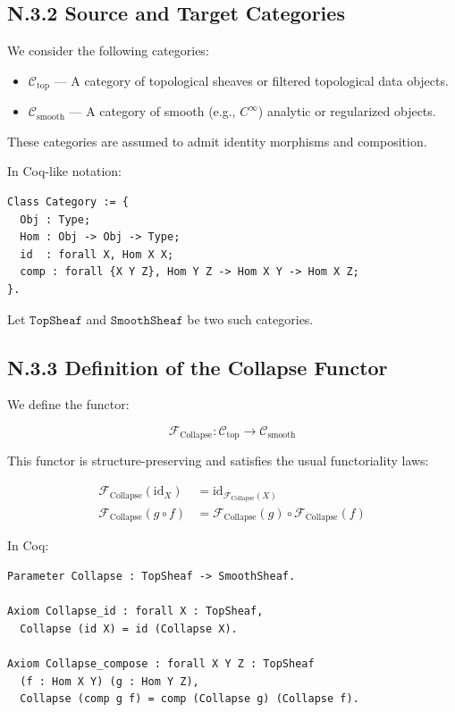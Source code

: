 \documentclass[11pt]{article}
\begin{document}
\subsection*{N.3.2 Source and Target Categories}

We consider the following categories:

\begin{itemize}
  \item $\mathcal{C}_{\mathrm{top}}$ — A category of topological sheaves or filtered topological data objects.
  \item $\mathcal{C}_{\mathrm{smooth}}$ — A category of smooth (e.g., $C^\infty$) analytic or regularized objects.
\end{itemize}

These categories are assumed to admit identity morphisms and composition.

In Coq-like notation:

\begin{verbatim}
Class Category := {
  Obj : Type;
  Hom : Obj -> Obj -> Type;
  id  : forall X, Hom X X;
  comp : forall {X Y Z}, Hom Y Z -> Hom X Y -> Hom X Z;
}.
\end{verbatim}

Let $\texttt{TopSheaf}$ and $\texttt{SmoothSheaf}$ be two such categories.

\subsection*{N.3.3 Definition of the Collapse Functor}

We define the functor:

\[
\mathcal{F}_{\mathrm{Collapse}} : \mathcal{C}_{\mathrm{top}} \longrightarrow \mathcal{C}_{\mathrm{smooth}}
\]

This functor is structure-preserving and satisfies the usual functoriality laws:

\begin{align*}
\mathcal{F}_{\mathrm{Collapse}}(\mathrm{id}_X) &= \mathrm{id}_{\mathcal{F}_{\mathrm{Collapse}}(X)} \\
\mathcal{F}_{\mathrm{Collapse}}(g \circ f) &= \mathcal{F}_{\mathrm{Collapse}}(g) \circ \mathcal{F}_{\mathrm{Collapse}}(f)
\end{align*}

In Coq:

\begin{verbatim}
Parameter Collapse : TopSheaf -> SmoothSheaf.

Axiom Collapse_id : forall X : TopSheaf,
  Collapse (id X) = id (Collapse X).

Axiom Collapse_compose : forall X Y Z : TopSheaf
  (f : Hom X Y) (g : Hom Y Z),
  Collapse (comp g f) = comp (Collapse g) (Collapse f).
\end{verbatim}
\end{document}
